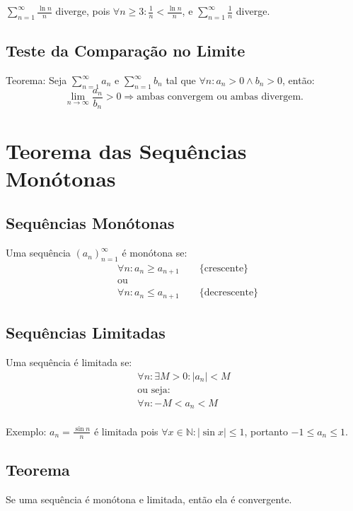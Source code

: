 \documentclass{article}
\begin{document}
$\sum\limits_{n=1}^\infty \frac{\ln n}{n}$ diverge, pois $\forall n \geq 3: \frac{1}{n} < \frac{\ln n}{n}$, e $\sum\limits_{n=1}^\infty \frac{1}{n}$ diverge.

\subsection{Teste da Compara\c{c}\~ao no Limite}
Teorema: Seja $\sum\limits_{n=1}^\infty a_n$ e $\sum\limits_{n=1}^\infty b_n$ tal que $\forall n: a_n > 0 \land b_n > 0$, ent\~ao:
\[ \lim_{n\to\infty} \frac{a_n}{b_n} > 0 \Rightarrow \text{ambas convergem ou ambas divergem.} \]



\section{Teorema das Sequ\^encias Mon\'otonas}

\subsection{Sequ\^encias Mon\'otonas}
Uma sequ\^encia ${(a_n)}_{n=1}^\infty$ \'e mon\'otona se:
\begin{align*}
  &\forall n: a_n \geq a_{n+1} \qquad \text{\{crescente\}} \\
  &\text{ou}\\
  &\forall n: a_n \leq a_{n+1} \qquad \text{\{decrescente\}}
\end{align*}

\subsection{Sequ\^encias Limitadas}
Uma sequ\^encia \'e limitada se:
\begin{gather*}
  \forall n: \exists M > 0: |a_n| < M \\
  \text{ou seja:} \\
  \forall n: -M < a_n < M
\end{gather*} \\[-5pt]
Exemplo: $a_n = \frac{\sin n}{n}$ \'e limitada pois $\forall x \in \mathbb{N}: |\sin x| \leq 1$, portanto $-1 \leq a_n \leq 1$.

\subsection{Teorema}
Se uma sequ\^encia \'e mon\'otona e limitada, ent\~ao ela \'e convergente.
\end{document}
